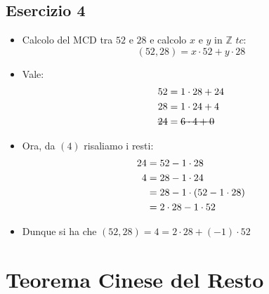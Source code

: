 \documentclass[10pt]{article}
\begin{document}
	\subsection{Esercizio 4}
	\begin{itemize}
	\item
	Calcolo del MCD tra $52$ e $28$ e calcolo $x$ e $y$ in $\mathbb{Z}$ $tc:$ $$(52,28) = x \cdot 52 + y \cdot 28$$
	\item
	Vale:
	\begin{equation}
	\begin{split}
	52 &= 1 \cdot 28 + 24 \\
	28 &= 1 \cdot 24 + 4 \\
	\hbox{\sout{$24$}} &= \hbox{\sout{$6 \cdot 4 + 0$}}
	\end{split}
	\end{equation}
	
	\item
	Ora, da $(4)$ risaliamo i resti:
	\begin{equation}
	\begin{split}
	24 &= 52 - 1 \cdot 28 \\
	4 &= 28 - 1 \cdot 24 \\
	&= 28 - 1 \cdot (52 - 1 \cdot 28) \\
	& = 2 \cdot 28 - 1 \cdot 52 
	\notag
	\end{split}
	\end{equation}
	\item
	Dunque si ha che $(52,28) = 4 = 2 \cdot 28 +(-1) \cdot 52  $
	\end{itemize}	
	\newpage		
	
  \section{Teorema Cinese del Resto}
\end{document}
